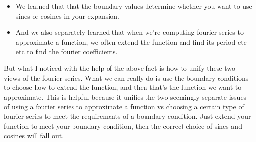 \documentclass{article}
\begin{document}
\begin{itemize}
    \item We learned that that the boundary values determine whether you want to use sines or cosines in your expansion.
    \item And we also separately learned that when we're computing fourier series to approximate a function, we often extend the function and find its period etc etc to find the fourier coefficients.
\end{itemize}
  But what I noticed with the help of the above fact is how to unify these two views of the fourier series. What we can really do is use the boundary conditions to choose how to extend the function, and then that's the function we want to approximate. This is helpful because it unifies the two seemingly separate issues of using a fourier series to approximate a function vs choosing a certain type of fourier series to meet the requirements of a boundary condition. Just extend your function to meet your boundary condition, then the correct choice of sines and cosines will fall out.
\end{document}
